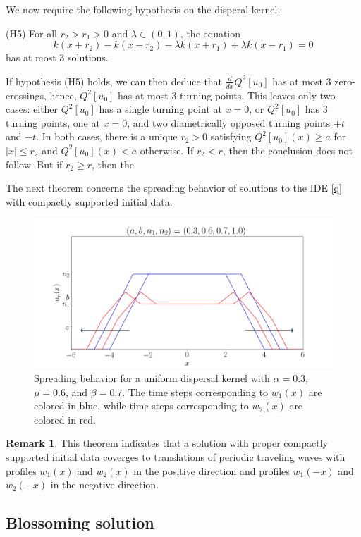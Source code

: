 \documentclass[11pt]{article}
\theoremstyle{definition}
\newtheorem{rem}[thm]{Remark}
\numberwithin{equation}{section}
\numberwithin{thm}{section}
\renewcommand{\a}{a}
\begin{document}
We now require the following hypothesis on the disperal kernel:

(H5) For all $r_2>r_1>0$ and $\lambda \in (0,1)$, the equation
$$ k(x+r_2) - k(x-r_2) - \lambda k(x+r_1) + \lambda k(x-r_1) = 0 $$
has at most 3 solutions.

If hypothesis (H5) holds, we can then deduce that $\frac{d}{dx}Q^2[u_0]$ has at most 3 zero-crossings, hence, $Q^2[u_0]$ has at most 3 turning points. This leaves only two cases: either $Q^2[u_0]$ has a single turning point at $x=0$, or $Q^2[u_0]$ has 3 turning points, one at $x=0$, and two diametrically opposed turning points $+t$ and $-t$. In both cases, there is a unique $r_2>0$ satisfying $Q^2[u_0](x) \geq \a$ for $|x| \leq r_2$ and $Q^2[u_0](x) < \a$ otherwise. If $r_2 < r$, then the conclusion does not follow. But if $r_2 \geq r$, then the 


The next theorem concerns the spreading behavior of solutions to the IDE \eqref{q} with compactly supported initial data.




\begin{figure}[h!] 
\centering
  \caption{Spreading behavior for a uniform dispersal kernel with $\alpha=0.3$, $\mu=0.6$, and $\beta=0.7$. The time steps corresponding to $w_1(x)$ are colored in blue, while time steps corresponding to $w_2(x)$ are colored in red.}
\label{fig5}
  \includegraphics[width=.8\linewidth]{figures/fig5.png}
\end{figure}

\begin{rem}
This theorem indicates that a solution with proper compactly supported initial data coverges to translations of periodic traveling waves with profiles $w_1(x)$ and $w_2(x)$ in the positive direction and profiles $w_1(-x)$ and $w_2(-x)$ in the negative direction.
\end{rem}

\subsection{Blossoming solution}
\end{document}
